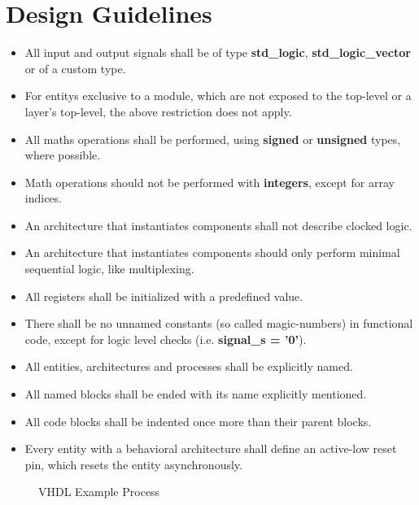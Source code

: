 \section{Design Guidelines}
\label{sec:DesignGuidelines}

\begin{itemize}[parsep=1pt]
	\item All input and output signals shall be of type \textbf{std\_logic}, \textbf{std\_logic\_vector} or of a custom type.
	\item For entitys exclusive to a module, which are not exposed to the top-level or a layer's top-level, the above restriction does not apply.
	\item All maths operations shall be performed, using \textbf{signed} or \textbf{unsigned} types, where possible.
	\item Math operations should not be performed with \textbf{integers}, except for array indices.
	\item An architecture that instantiates components shall not describe clocked logic.
	\item An architecture that instantiates components should only perform minimal sequential logic, like multiplexing.
	\item All registers shall be initialized with a predefined value.
	\item There shall be no unnamed constants (so called magic-numbers) in functional code, except for logic level checks (i.e. \textbf{signal\_s = '0'}).
	\item All entities, architectures and processes shall be explicitly named.
	\item All named blocks shall be ended with its name explicitly mentioned.
	\item All code blocks shall be indented once more than their parent blocks.
	\item Every entity with a behavioral architecture shall define an active-low reset pin, which resets the entity asynchronously.
\end{itemize}

\begin{figure}[hbt]
	
	\label{fig:process}
	\caption{VHDL Example Process}
\end{figure}

\newpage